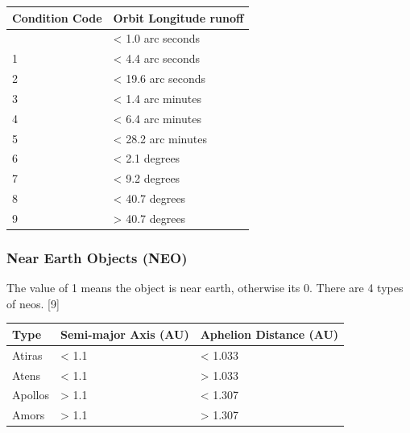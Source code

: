 \documentclass[
]{article}
\begin{document}
\begin{longtable}[]{@{}ll@{}}
\toprule\noalign{}
Condition Code & Orbit Longitude runoff \\
\midrule\noalign{}
\endhead
\bottomrule\noalign{}
\endlastfoot
0 & \textless{} 1.0 arc seconds \\
1 & \textless{} 4.4 arc seconds \\
2 & \textless{} 19.6 arc seconds \\
3 & \textless{} 1.4 arc minutes \\
4 & \textless{} 6.4 arc minutes \\
5 & \textless{} 28.2 arc minutes \\
6 & \textless{} 2.1 degrees \\
7 & \textless{} 9.2 degrees \\
8 & \textless{} 40.7 degrees \\
9 & \textgreater{} 40.7 degrees \\
\end{longtable}

\hypertarget{near-earth-objects-neo}{%
\subsubsection{Near Earth Objects (NEO)}\label{near-earth-objects-neo}}

The value of 1 means the object is near earth, otherwise its 0. There
are 4 types of neos. {[}9{]}

\begin{longtable}[]{@{}lll@{}}
\toprule\noalign{}
Type & Semi-major Axis (AU) & Aphelion Distance (AU) \\
\midrule\noalign{}
\endhead
\bottomrule\noalign{}
\endlastfoot
Atiras & \textless{} 1.1 & \textless{} 1.033 \\
Atens & \textless{} 1.1 & \textgreater{} 1.033 \\
Apollos & \textgreater{} 1.1 & \textless{} 1.307 \\
Amors & \textgreater{} 1.1 & \textgreater{} 1.307 \\
\end{longtable}
\end{document}
